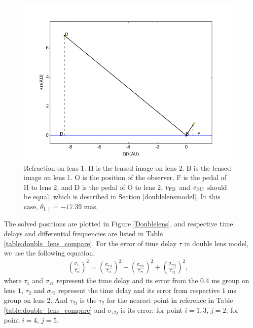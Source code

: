 \documentclass[useAMS,usenatbib]{mn2e}
\begin{document}
\begin{figure}
\centering
\includegraphics[width=1.0\linewidth]{Second_reflection.png}
\caption{Refraction on lens 1. 
H is the lensed image on lens 2. B is the lensed image on lens 1. O is the position of the observer. F is the pedal of H to lens 2, and D is the pedal of O to lens 2. $v_{\rm FB}$ and $v_{\rm BD}$ should be equal, which is described in Section \ref{doublelensmodel}. In this case, $\theta_{1\parallel} = -17.39$ mas. }
\label{second_reflect}
\end{figure}



The solved positions are plotted in Figure \ref{Doublelens}, and respective time delays and differential frequencies are listed in Table \ref{table:double_lens_compare}. For the error of time delay $\tau$ in double lens model, we use the following equation: 
\begin{equation}
\begin{aligned}
(\frac{\sigma_{\tau_i}}{\tau_{2i}})^2 = (\frac{\sigma_{\tau1i}}{\tau_{1i}})^2+(\frac{\sigma_{\tau2i}}{\tau_{2i}})^2 + (\frac{\sigma_{\tau2j}}{\tau_{2j}})^2,
\end{aligned}
\end{equation}
where $\tau_1$ and $\sigma_{\tau1}$ represent the time delay and its error from the $0.4$ ms group on lens $1$, $\tau_2$ and $\sigma_{\tau2}$ represent the time delay and its error from respective $1$ ms group on lens 2. And $\tau_{2j}$ is the $\tau_2$ for the nearest point in reference in Table \ref{table:double_lens_compare} and $\sigma_{\tau2j}$ is its error: for point $i=1,3$, $j=2$; for point $i=4$, $j=5$.
\end{document}
